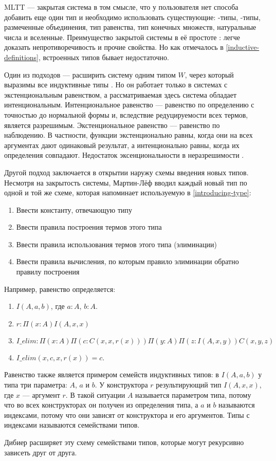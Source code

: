 \label{inductive-families}
MLTT --- закрытая система в том смысле, что у пользователя нет способа добавить
еще один тип и необходимо использовать существующие: \textPi-типы,
\textSigma-типы, размеченные объединения, тип равенства, тип конечных множеств,
натуральные числа и вселенные. Преимущество закрытой системы в её простоте
\cite{observational-equality-now}: легче доказать непротиворечивость и прочие свойства.
Но как отмечалось в \ref{inductive-definitions}, встроенных типов бывает недостаточно.

Один из подходов --- расширить систему одним типом \(W\), через который выразимы
все индуктивные типы \cite{inductive-families}. Но он работает только в системах
с экстенциональным равенством, а рассматриваемая здесь система обладает интенциональным.
Интенциональное равенство --- равенство по определению с точностью до нормальной
формы и, вследствие редуцируемости всех термов, является разрешимым. Экстенциональное
равенство --- равенство по наблюдению. В частности, функции экстенционально равны,
когда они на всех аргументах дают одинаковый результат, а интенционально равны,
когда их определения совпадают. Недостаток эксенциональности в неразрешимости
\cite{observational-equality-now}.

Другой подход заключается в открытии наружу схемы введения новых типов.
Несмотря на закрытость системы, Мартин-Лёф вводил каждый новый тип по одной
и той же схеме, которая напоминает используемую в \ref{introducing-type}:
\begin{enumerate}
\item Ввести константу, отвечающую типу
\item Ввести правила построения термов этого типа
\item Ввести правила использования термов этого типа (элиминации)
\item Ввести правила вычисления, по которым правило элиминации обратно
  правилу построения
\end{enumerate}

Например, равенство определяется:
\begin{enumerate}
\item \(I(A, a, b)\), где \(a : A\), \(b : A\).
\item \(r : \Pi(x : A)I(A, x, x)\)
\item \(I\_elim : \Pi(x : A) \Pi(c : C(x, x, r(x))) \Pi(y : A) \Pi(z : I(A, x, y)) C(x, y, z)\)
\item \(I\_elim(x, c, x, r(x)) = c\).
\end{enumerate}

Равенство также является примером семейств индуктивных типов: в \(I(A, a, b)\)
у типа три параметра: \(A\), \(a\) и \(b\). У конструктора \(r\) результирующий
тип \(I(A, x, x)\), где \(x\) --- аргумент \(r\). В такой ситуации \(A\) называется
параметром типа, потому что во всех конструкторах он получен из определения
типа, а \(a\) и \(b\) называются индексами, потому что они зависят от конструктора
и его аргументов. Типы с индексами называются семействами типов.

Дибиер \cite{inductive-families} расширяет эту схему семействами типов,
которые могут рекурсивно зависеть друг от друга.
